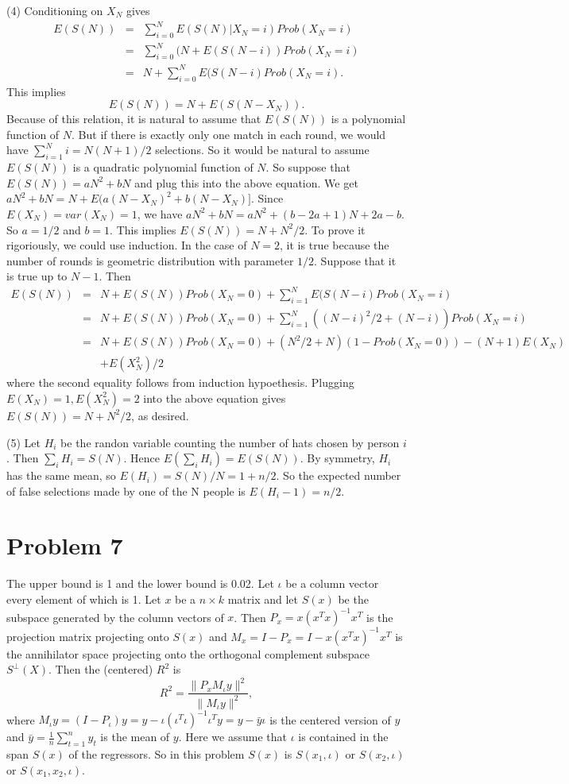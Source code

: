 \documentclass[12pt]{amsart}
\begin{document}
(4)  Conditioning on $X_N$ gives
\begin{eqnarray*}
E(S(N))&=&\sum_{i=0}^NE(S(N)|X_N=i)Prob(X_N=i)\\
&=&\sum_{i=0}^N(N+E(S(N-i))Prob(X_N=i)\\
&=&N+\sum_{i=0}^NE(S(N-i)Prob(X_N=i).
\end{eqnarray*}
This implies $$E(S(N))=N+E(S(N-X_N)).$$ Because of this relation, it is natural to assume that $E(S(N))$ is a polynomial function of $N$. But if there is exactly only one match in each round, we would have $\sum_{i=1}^Ni=N(N+1)/2$  selections. So it would be natural to assume $E(S(N))$ is a quadratic polynomial function of $N$. So suppose that $E(S(N))= aN^2+bN$ and plug this into the above equation. We get 
$aN^2+bN=N+E(a(N-X_N)^2+b(N-X_N)]$. Since $E(X_N)=var(X_N)=1$, we have $aN^2+bN=aN^2+(b-2a+1)N+2a-b$. So $a=1/2$ and $b=1$. This implies $E(S(N))=N+N^2/2$. To prove it rigoriously, we could use induction. In the case of $N=2$, it is true because the number of rounds is geometric distribution with parameter $1/2$. Suppose that it is true up to $N-1$. Then
\begin{eqnarray*}
E(S(N))&=&N+E(S(N))Prob(X_N=0)+\sum_{i=1}^NE(S(N-i)Prob(X_N=i)\\
&=&N+E(S(N))Prob(X_N=0)+\sum_{i=1}^N((N-i)^2/2+(N-i))Prob(X_N=i)\\
&=&N+E(S(N))Prob(X_N=0)+(N^2/2+N)(1-Prob(X_N=0))-(N+1)E(X_N)\\
& &+E(X_N^2)/2
\end{eqnarray*}
where the second equality follows from induction hypoethesis. Plugging $E(X_N)=1,E(X_N^2)=2$ into the above equation gives $E(S(N))=N+N^2/2$, as desired.

(5)  Let $H_i$ be the randon variable counting the number of hats chosen by person $i$. Then $\sum_i H_i = S(N)$. Hence $E(\sum_iH_i)=E(S(N))$. By symmetry, $H_i$ has the same mean, so $E(H_i)=S(N)/N=1+n/2$. So the expected number of false selections made by
one of the N people is $E(H_i-1)=n/2$. 

\section{Problem 7}
The upper bound is 1 and the lower bound is 0.02.  Let $\iota$ be a column vector every element of which is 1. Let $x$ be a $n\times k$ matrix and let $S(x)$ be the subspace generated by the column vectors of $x$. Then
$P_x=x(x^Tx)^{-1}x^T$ is the projection matrix projecting onto $S(x)$ and $M_x=I-P_x=I-x(x^Tx)^{-1}x^T$ is the annihilator space projecting onto the orthogonal complement subspace $S^{\bot}(X)$. Then the (centered) $R^2$ is
$$R^2=\frac{\|P_xM_{\iota}y\|^2}{\|M_{\iota}y\|^2},$$
where $M_{\iota}y=(I-P_{\iota})y=y-\iota(\iota^T\iota)^{-1}\iota^Ty=y-\bar{y}\iota$ is the centered version of $y$ and $\bar{y}=\frac{1}{n}\sum_{t=1}^ny_t$ is the mean of $y$. Here we assume that $\iota$ is contained in the span $S(x)$ of the regressors. So in this problem
$S(x)$ is $S(x_1,\iota)$ or $S(x_2,\iota)$ or $S(x_1,x_2,\iota)$. 
 
\end{document}
